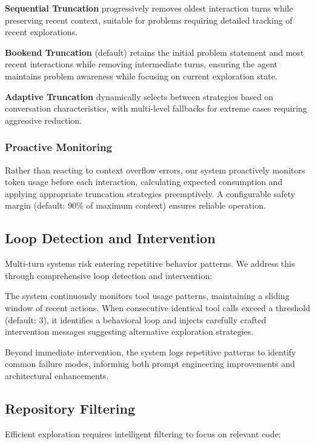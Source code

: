 \documentclass[11pt]{article}
\begin{document}
\textbf{Sequential Truncation} progressively removes oldest interaction turns while preserving recent context, suitable for problems requiring detailed tracking of recent explorations.

\textbf{Bookend Truncation} (default) retains the initial problem statement and most recent interactions while removing intermediate turns, ensuring the agent maintains problem awareness while focusing on current exploration state.

\textbf{Adaptive Truncation} dynamically selects between strategies based on conversation characteristics, with multi-level fallbacks for extreme cases requiring aggressive reduction.

\subsubsection{Proactive Monitoring}
Rather than reacting to context overflow errors, our system proactively monitors token usage before each interaction, calculating expected consumption and applying appropriate truncation strategies preemptively. A configurable safety margin (default: 90\% of maximum context) ensures reliable operation.

\subsection{Loop Detection and Intervention}

Multi-turn systems risk entering repetitive behavior patterns. We address this through comprehensive loop detection and intervention:

The system continuously monitors tool usage patterns, maintaining a sliding window of recent actions. When consecutive identical tool calls exceed a threshold (default: 3), it identifies a behavioral loop and injects carefully crafted intervention messages suggesting alternative exploration strategies.

Beyond immediate intervention, the system logs repetitive patterns to identify common failure modes, informing both prompt engineering improvements and architectural enhancements.

\subsection{Repository Filtering}

Efficient exploration requires intelligent filtering to focus on relevant code:
\end{document}
